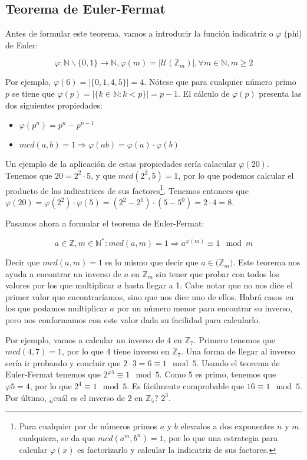 \subsection{Teorema de Euler-Fermat}

Antes de formular este teorema, vamos a introducir la función indicatriz o $\varphi$ (phi) de Euler:

\[\varphi : \mathbb{N} \backslash \{0,1\} \rightarrow \mathbb{N}, \varphi(m) = |\mathcal{U}(\mathbb{Z}_m)|, \forall m \in\mathbb{N}, m \geq 2\]

Por ejemplo, $\varphi(6) = |\{0, 1, 4, 5\}| = 4$.
Nótese que para cualquier número primo $p$ se tiene que $\varphi(p) = |\{k \in\mathbb{N} : k < p\}| = p-1$.
El cálculo de $\varphi(p)$ presenta las dos siguientes propiedades:

\begin{itemize}
	\item
		$\varphi(p^n) = p^n - p^{n-1}$
	\item
		$mcd(a,b) = 1 \Rightarrow \varphi(ab) = \varphi(a) \cdot \varphi(b)$
\end{itemize}

Un ejemplo de la aplicación de estas propiedades sería calacular $\varphi(20)$.
Tenemos que $20 = 2^2 \cdot 5$, y que $mcd(2^2, 5) = 1$, por lo que podemos calcular el producto de las indicatrices de sus factores\footnote{%
	Para cualquier par de números primos $a$ y $b$ elevados a dos exponentes $n$ y $m$ cualquiera, se da que $mcd(a^m, b^n) = 1$, por lo que una estrategia para calcular $\varphi(x)$ es factorizarlo y calcular la indicatriz de sus factores.
}.
Tenemos entonces que $\varphi(20) = \varphi(2^2) \cdot \varphi(5) = (2^2 - 2^1) \cdot (5 - 5^0) = 2 \cdot 4 = 8$.

Pasamos ahora a formular el teorema de Euler-Fermat:

\[a \in\mathbb{Z}, m \in\mathbb{N}^* : mcd(a,m) = 1 \Rightarrow a^{\varphi(m)} \equiv 1 \mod m\]

Decir que $mcd(a,m) = 1$ es lo mismo que decir que $a \in\mathcal(\mathbb{Z}_m)$.
Este teorema nos ayuda a encontrar un inverso de $a$ en $\mathbb{Z}_m$ sin tener que probar con todos los valores por los que multiplicar $a$ hasta llegar a 1.
Cabe notar que no nos dice el primer valor que encontraríamos, sino que nos dice uno de ellos.
Habrá casos en los que podamos multiplicar $a$ por un número menor para encontrar su inverso, pero nos conformamos con este valor dada su facilidad para calcularlo.

Por ejemplo, vamos a calcular un inverso de 4 en $\mathbb{Z}_7$.
Primero tenemos que $mcd(4,7) = 1$, por lo que 4 tiene inverso en $\mathbb{Z}_7$.
Una forma de llegar al inverso sería ir probando y concluir que $2 \cdot 3 = 6 \equiv 1 \mod 5$.
Usando el teorema de Euler-Fermat tenemos que $2^{\varphi{5}} \equiv 1 \mod 5$.
Como 5 es primo, tenemos que $\varphi{5} = 4$, por lo que $2^4 \equiv 1 \mod 5$.
Es fácilmente comprobable que $16 \equiv 1 \mod 5$.
Por último, ¿cuál es el inverso de 2 en $\mathbb{Z}_5$?
$2^3$.
